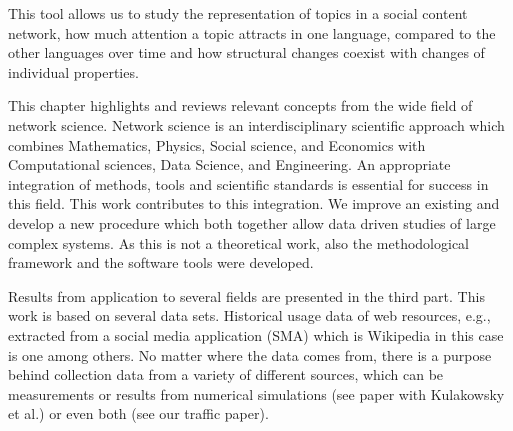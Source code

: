 \documentclass[a4paper,10pt]{scrbook}
\begin{document}
This tool allows us to study the representation of topics in a social content network, how much attention a topic attracts in one language, compared to the other languages over time and how structural changes coexist with changes of individual properties.  


 

This chapter highlights and reviews relevant concepts from the wide field of network science. Network science is an interdisciplinary scientific approach which combines Mathematics, Physics, Social science, and Economics with Computational sciences, Data Science, and Engineering. An appropriate integration of methods, tools and scientific standards is essential for success in this field. This work contributes to this integration. We improve an existing and develop a new procedure which both together allow data driven studies of large complex systems. As this is not a theoretical work, also the methodological framework and the software tools were developed. 

Results from application to several fields are presented in the third part.
This work is based on several data sets. Historical usage data of web resources, e.g., extracted from a social media application (SMA) which is Wikipedia in this case is one among others. No matter where the data comes from, there is a purpose behind collection data from a variety of different sources, which can be measurements or results from numerical simulations (see paper with Kulakowsky et al.) or even both (see our traffic paper).
\end{document}
